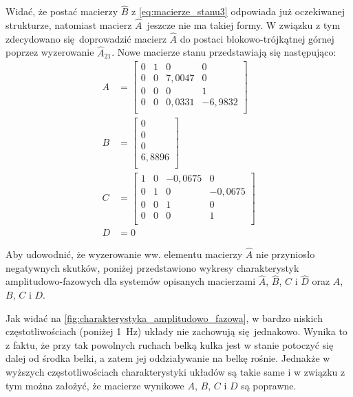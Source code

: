 Widać, że postać macierzy $\hat{B}$ z \eqref{eq:macierze_stanu3} odpowiada już oczekiwanej strukturze, natomiast macierz $\hat{A}$~jeszcze nie ma takiej formy. W związku z tym zdecydowano się doprowadzić macierz $\hat{A}$ do postaci blokowo-trójkątnej górnej poprzez wyzerowanie $\hat{A}_{21}$. Nowe macierze stanu przedstawiają się następująco:
\begin{align}
    A &= \begin{bmatrix}
    0 & 1 & 0 & 0 \\
    0 & 0 & 7,0047 & 0 \\
    0 & 0 & 0 & 1 \\
    0 & 0 & 0,0331 & -6,9832 \\
    \end{bmatrix} \nonumber \\
    B &= \begin{bmatrix}
    0 \\
    0 \\
    0 \\
    6,8896 \\
    \end{bmatrix} \nonumber \\
    C &= \begin{bmatrix}
    1 & 0 & -0,0675 & 0 \\
    0 & 1 & 0 & -0,0675 \\
    0 & 0 & 1 & 0 \\
    0 & 0 & 0 & 1 \\
    \end{bmatrix} \nonumber \\
    D &= 0 \label{eq:macierze_stanu4}
\end{align}

Aby udowodnić, że wyzerowanie ww. elementu macierzy $\hat{A}$ nie przyniosło negatywnych skutków, poniżej przedstawiono wykresy charakterystyk amplitudowo-fazowych dla systemów opisanych macierzami $\hat{A}$, $\hat{B}$, $\hat{C}$ i $\hat{D}$ oraz $A$, $B$, $C$ i $D$.

Jak widać na \cref{fig:charakterystyka_amplitudowo_fazowa}, w bardzo niskich częstotliwościach (poniżej \SI{1}{\hertz}) układy nie zachowują się jednakowo. Wynika to z faktu, że przy tak powolnych ruchach belką kulka jest w stanie potoczyć się dalej od środka belki, a zatem jej oddziaływanie na belkę rośnie. Jednakże w wyższych częstotliwościach charakterystyki układów są takie same i w związku z tym można założyć, że macierze wynikowe $A$, $B$, $C$ i $D$ są poprawne.

